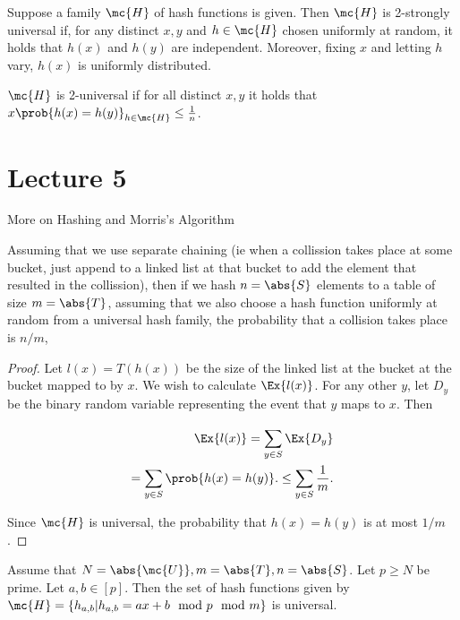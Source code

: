 \documentclass[../main.tex]{subfiles}
\begin{document}
\begin{definition}
    Suppose a family $\mc{H}$ of hash functions is given. Then
    $\mc{H}$ is 2-strongly universal if, for any distinct $x,y$ and $h \in \mc{H}$ chosen uniformly at random, it holds that
    $h(x)$ and $h(y)$ are independent. Moreover, fixing $x$
    and letting $h$ vary, $h(x)$ is uniformly distributed.
\end{definition}

\begin{definition}
    $\mc{H}$ is 2-universal if for all distinct $x,y$ it holds
    that $x\prob{h(x) = h(y)}_{h \in \mc{H}} \leq \frac{1}{n}$.
\end{definition}

\section{Lecture 5}{More on Hashing and Morris's Algorithm}
\begin{theorem}
    Assuming that we use separate chaining (ie when a collission takes place at some bucket, just append to a linked list at that bucket to add the element that resulted in the collission), then if we hash $n = \abs{S}$ elements to a table of size $m = \abs{T}$, assuming that we also choose a hash function uniformly at random from a universal hash family, the probability that a collision takes place is $n/m$,
\end{theorem}
\begin{proof}
    Let $l(x) = T(h(x))$ be the size of the linked list at the bucket at the bucket mapped to by $x$. We wish to calculate
    $\Ex{l(x)}$. For any other $y$, let $D_y$ be the binary random variable representing the event that $y$ maps to $x$. Then

    \begin{align*}
        \Ex{l(x)} = \sum_{y \in S}^{}\Ex{D_{y}} \\
         = \sum_{y \in S}^{}\prob{h(x) = h(y)}.
         \leq \sum_{y \in S}^{}\frac{1}{m}.
    \end{align*}

    Since $\mc{H}$ is universal, the probability that $h(x)
    = h(y)$ is at most $1/m$.
\end{proof}

\begin{theorem}
    Assume that $N =\abs{\mc{U}}, m = \abs{T}, n = \abs{S}$. Let $p \geq N$ be prime. Let $a,b \in [p]$. Then the set of hash functions given by
    $\mc{H} = \left\{h_{a,b}| h_{a,b} = ax + b \mod p \mod m  \right\}$ is universal.
\end{theorem}
\end{document}
